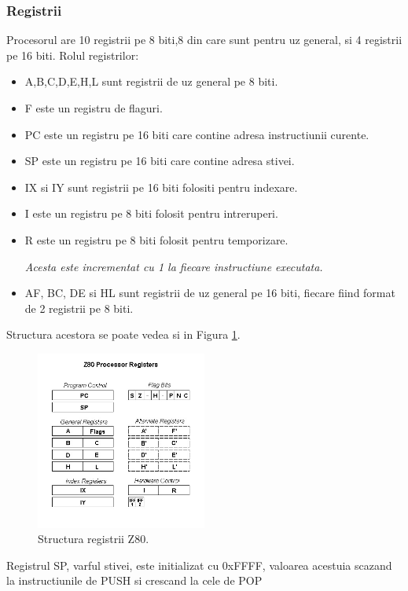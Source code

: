 \documentclass[titlepage,12pt]{article}
\begin{document}
\subsubsection{Registrii}
\cite{ref:z80instructions}Procesorul are 10 registrii pe 8 biti,8 din care sunt pentru uz general, si 4 registrii pe 16 biti.
Rolul registrilor:
\begin{itemize}
    \item A,B,C,D,E,H,L sunt registrii de uz general pe 8 biti.
    \item F este un registru de flaguri.
    \item PC este un registru pe 16 biti care contine adresa instructiunii curente.
    \item SP este un registru pe 16 biti care contine adresa stivei.
    \item IX si IY sunt registrii pe 16 biti folositi pentru indexare.
    \item I este un registru pe 8 biti folosit pentru intreruperi.
    \item R este un registru pe 8 biti folosit pentru temporizare.
    \par \hspace{1em} \textit{Acesta este incrementat cu 1 la fiecare instructiune executata.}
    \item AF, BC, DE si HL sunt registrii de uz general pe 16 biti, fiecare fiind format de 2 registrii pe 8 biti.
\end{itemize}
Structura acestora se poate vedea si in Figura \ref{fig:z80registers}.
\begin{figure}[H]
    \centering
    \includegraphics[width=0.5\textwidth]{images/z80registers.jpg}
    \caption{Structura registrii Z80. \cite{ref:z80registers}}
    \label{fig:z80registers}
\end{figure}

Registrul SP, varful stivei, este initializat cu 0xFFFF, valoarea acestuia scazand la instructiunile de PUSH si crescand la cele de POP
\end{document}
